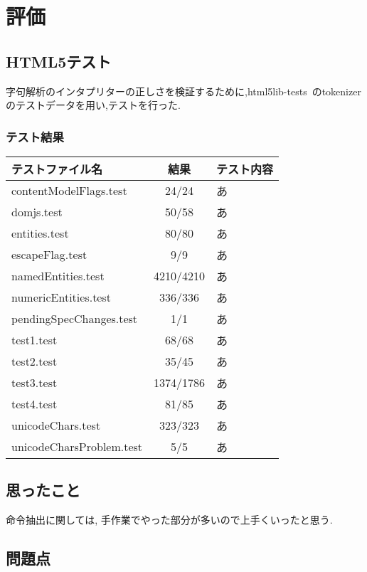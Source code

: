 \documentclass[uplatex,a4j]{jsreport}
\begin{document}
\chapter{評価}
\label{評価}
\section{HTML5テスト}
字句解析のインタプリターの正しさを検証するために,html5lib-tests~\cite{html5lib-tests}のtokenizerのテストデータを用い,テストを行った.
\subsection*{テスト結果}
\begin{table}[htb]
    \begin{tabular}{|l|c|l|} \hline
      テストファイル名 & 結果 & テスト内容\\ \hline 
      contentModelFlags.test & 24/24 & あ\\
      domjs.test & 50/58 & あ\\
      entities.test & 80/80 & あ\\
      escapeFlag.test & 9/9 & あ\\
      namedEntities.test & 4210/4210 & あ\\
      numericEntities.test & 336/336 & あ\\
      pendingSpecChanges.test & 1/1 & あ\\
      test1.test & 68/68 & あ\\
      test2.test & 35/45 & あ\\
      test3.test & 1374/1786 & あ\\
      test4.test & 81/85 & あ\\
      unicodeChars.test & 323/323 & あ\\
      unicodeCharsProblem.test & 5/5 & あ\\ \hline 
    \end{tabular}
\end{table}

\section{思ったこと}
命令抽出に関しては, 手作業でやった部分が多いので上手くいったと思う.

\section{問題点}
\end{document}
